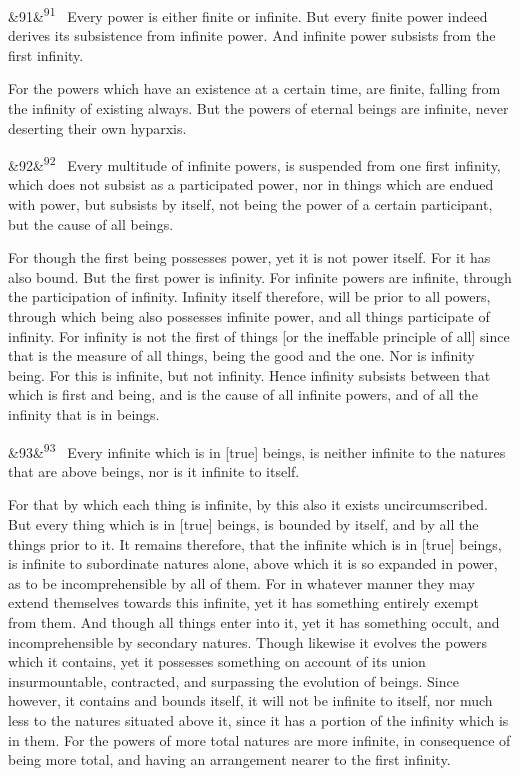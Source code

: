 \documentclass[12pt]{article}
\newcommand{\para}[1][]{\par\noindent\ifx&#1&\else\textsuperscript{\footnotesize #1}~\fi}
\begin{document}
\para[91] Every power is either finite or infinite. But every finite power indeed derives its subsistence from infinite power. And infinite power subsists from the first infinity.

For the powers which have an existence at a certain time, are finite, falling from the infinity of existing always. But the powers of eternal beings are infinite, never deserting their own hyparxis.

\para[92] Every multitude of infinite powers, is suspended from one first infinity, which does not subsist as a participated power, nor in things which are endued with power, but subsists by itself, not being the power of a certain participant, but the cause of all beings.

For though the first being possesses power, yet it is not power itself. For it has also bound. But the first power is infinity. For infinite powers are infinite, through the participation of infinity. Infinity itself therefore, will be prior to all powers, through which being also possesses infinite power, and all things participate of infinity. For infinity is not the first of things [or the ineffable principle of all] since that is the measure of all things, being the good and the one. Nor is infinity being. For this is infinite, but not infinity. Hence infinity subsists between that which is first and being, and is the cause of all infinite powers, and of all the infinity that is in beings.

\para[93] Every infinite which is in [true] beings, is neither infinite to the natures that are above beings, nor is it infinite to itself.

For that by which each thing is infinite, by this also it exists uncircumscribed. But every thing which is in [true] beings, is bounded by itself, and by all the things prior to it. It remains therefore, that the infinite which is in [true] beings, is infinite to subordinate natures alone, above which it is so expanded in power, as to be incomprehensible by all of them. For in whatever manner they may extend themselves towards this infinite, yet it has something entirely exempt from them. And though all things enter into it, yet it has something occult, and incomprehensible by secondary natures. Though likewise it evolves the powers which it contains, yet it possesses something on account of its union insurmountable, contracted, and surpassing the evolution of beings. Since however, it contains and bounds itself, it will not be infinite to itself, nor much less to the natures situated above it, since it has a portion of the infinity which is in them. For the powers of more total natures are more infinite, in consequence of being more total, and having an arrangement nearer to the first infinity.
\end{document}
